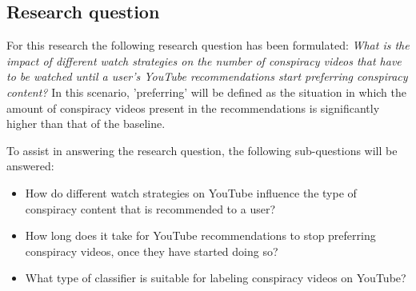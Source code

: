 \documentclass[../main.tex]{subfiles}
\begin{document}
\subsection{Research question}
For this research the following research question has been formulated:
\textit{What is the impact of different watch strategies on the number of conspiracy videos that have to
be watched until a user's YouTube recommendations start preferring conspiracy content?} In this scenario,
'preferring' will be defined as the situation in which the amount of conspiracy videos present in the
recommendations is significantly higher than that of the baseline.

To assist in answering the research question, the following sub-questions will be answered:
\begin{itemize}
    \item How do different watch strategies on YouTube influence the type of conspiracy content that is recommended to a user?
    \item How long does it take for YouTube recommendations to stop preferring conspiracy videos, once they have started doing so?
    \item What type of classifier is suitable for labeling conspiracy videos on YouTube?
\end{itemize}
\end{document}
